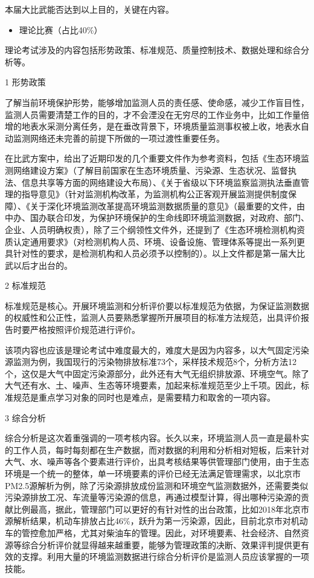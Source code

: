 \documentclass[]{book}
\providecommand{\tightlist}{%
  \setlength{\itemsep}{0pt}\setlength{\parskip}{0pt}}
\begin{document}
本届大比武能否达到以上目的，关键在内容。

\begin{itemize}
\tightlist
\item
  理论比赛（占比40\%）
\end{itemize}

理论考试涉及的内容包括形势政策、标准规范、质量控制技术、数据处理和综合分析等。

1 形势政策

了解当前环境保护形势，能够增加监测人员的责任感、使命感，减少工作盲目性，监测人员需要清楚工作的目的，才不会湮没在无穷尽的工作业务中，比如工作量倍增的地表水采测分离任务，是在垂改背景下，环境质量监测事权被上收，地表水自动监测网络还未完善的前提下所做的一项过渡性重要任务。

在比武方案中，给出了近期印发的几个重要文件作为参考资料，包括《生态环境监测网络建设方案》（了解目前国家在生态环境质量、污染源、生态状况、监督执法、信息共享等方面的网络建设大布局）、《关于省级以下环境监察监测执法垂直管理的指导意见》（针对监测机构改革，为监测机构公正客观开展监测提供制度保障）、《关于深化环境监测改革提高环境监测数据质量的意见》（最重要的文件，由中办、国办联合印发，为保护环境保护的生命线即环境监测数据，对政府、部门、企业、人员明确权责），除了三个纲领性文件外，还提到了《生态环境检测机构资质认定通用要求》（对检测机构人员、环境、设备设施、管理体系等提出一系列更具针对性的要求，是检测机构和人员必须予以控制的）。以上文件都是第一届大比武以后才出台的。

2 标准规范

标准规范是核心。开展环境监测和分析评价要以标准规范为依据，为保证监测数据的权威性和公正性，监测人员要熟悉掌握所开展项目的标准方法规范，出具评价报告时要严格按照评价规范进行评价。

该项内容也应该是理论考试中难度最大的，难度大是因为内容多，以大气固定污染源监测为例，我国现行的污染物排放标准73个，采样技术规范8个，分析方法12个，这仅是大气中固定污染源部分，此外还有大气无组织排放源、环境空气。除了大气还有水、土、噪声、生态等环境要素，加起来标准规范至少上千项。因此，标准规范是重点学习对象的同时也是难点，是需要精力和取舍的一项内容。

3 综合分析

综合分析是这次着重强调的一项考核内容。长久以来，环境监测人员一直是最朴实的工作人员，每时每刻都在生产数据，而对数据的利用和分析相对短板，后来针对大气、水、噪声等各个要素进行评价，出具考核结果等供管理部门使用，由于生态环境是一个统一的整体，单一环境要素的评价已经无法满足管理需求，以北京市PM2.5源解析为例，除了污染源排放成份监测和环境空气监测数据外，还需要类似污染源排放工况、车流量等污染源的信息，再通过模型计算，得出哪种污染源的贡献比例最高，据此，管理部门可以更好的有针对性的出台政策，比如2018年北京市源解析结果，机动车排放占比46\%，跃升为第一污染源，因此，目前北京市对机动车的管控愈加严格，尤其对柴油车的管理。因此，对环境要素、社会经济、自然资源等综合分析评价就显得越来越重要，能够为管理政策的决断、效果评判提供更有效的支撑。利用大量的环境监测数据进行综合分析评价是监测人员应该掌握的一项技能。
\end{document}
